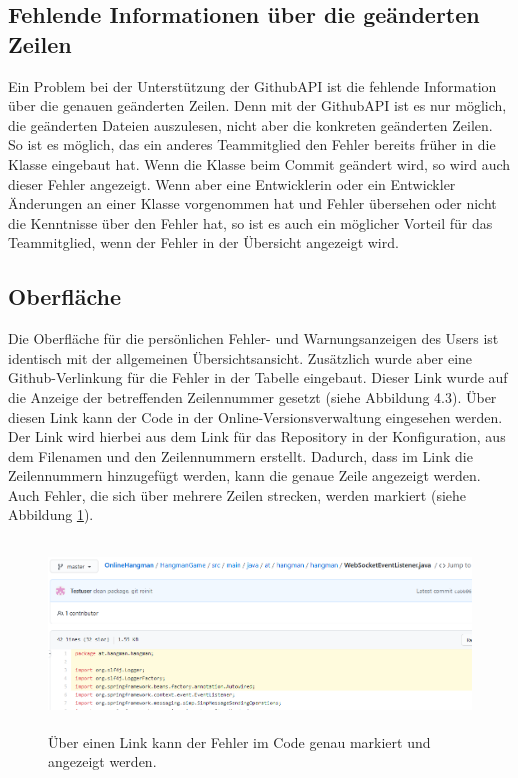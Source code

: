 \subsection{Fehlende Informationen über die geänderten Zeilen}
Ein Problem bei der Unterstützung der GithubAPI ist die fehlende Information über die genauen geänderten Zeilen. Denn mit der GithubAPI ist es nur möglich, die geänderten Dateien auszulesen, nicht aber die konkreten geänderten Zeilen. So ist es möglich, das ein anderes Teammitglied den Fehler bereits früher in die Klasse eingebaut hat. Wenn die Klasse beim Commit geändert wird, so wird auch dieser Fehler angezeigt. Wenn aber eine Entwicklerin oder ein Entwickler Änderungen an einer Klasse vorgenommen hat und Fehler übersehen oder nicht die Kenntnisse über den Fehler hat, so ist es auch ein möglicher Vorteil für das Teammitglied, wenn der Fehler in der Übersicht angezeigt wird. 
\subsection{Oberfläche}
Die Oberfläche für die persönlichen Fehler- und Warnungsanzeigen des Users ist identisch mit der allgemeinen Übersichtsansicht. Zusätzlich wurde aber eine Github-Verlinkung für die Fehler in der Tabelle eingebaut. Dieser Link wurde auf die Anzeige der betreffenden Zeilennummer gesetzt (siehe Abbildung 4.3). Über diesen Link kann der Code in der Online-Versionsverwaltung eingesehen werden. Der Link wird hierbei aus dem Link für das Repository in der Konfiguration, aus dem Filenamen und den Zeilennummern erstellt. Dadurch, dass im Link die Zeilennummern hinzugefügt werden, kann die genaue Zeile angezeigt werden. Auch Fehler, die sich über mehrere Zeilen strecken, werden markiert (siehe Abbildung \ref{fig:markedFindings}). 
\begin{figure}[tp]
  \centering
  \includegraphics[height=5cm]{images/markedFindings.PNG}
 \caption[Anzeige der markierten Fehler]{Über einen Link kann der Fehler im Code genau markiert und angezeigt werden.}
  \label{fig:markedFindings}
\end{figure}
